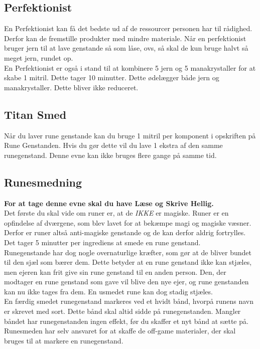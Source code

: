 \subsection{Perfektionist}
En Perfektionist kan få det bedste ud af de ressourcer personen har til rådighed. Derfor kan de fremstille produkter med mindre materiale. Når en perfektionist bruger jern til at lave genstande så som låse, ovs, så skal de kun bruge halvt så meget jern, rundet op.\\

En Perfektionist er også i stand til at kombinere 5 jern og 5 manakrystaller for at skabe 1 mitril. Dette tager 10 minutter. Dette ødelægger både jern og manakrystaller. Dette bliver ikke reduceret.\\

\subsection{Titan Smed}
Når du laver rune genstande kan du bruge 1 mitril per komponent i opskriften på Rune Genstanden. Hvis du gør dette vil du lave 1 ekstra af den samme runegenstand. Denne evne kan ikke bruges flere gange på samme tid.

\subsection{Runesmedning}
\textbf{For at tage denne evne skal du have Læse og Skrive Hellig.}\\
Det første du skal vide om runer er, at de \emph{IKKE} er magiske. Runer er en opfindelse af dværgene, som blev lavet for at bekæmpe magi og magiske væsner. Derfor er runer altså anti-magiske genstande og de kan derfor aldrig fortrylles.\\
Det tager 5 minutter per ingrediens at smede en rune genstand.\\
Runegenstande har dog nogle overnaturlige kræfter, som gør at de bliver bundet til den sjæl som bærer dem. Dette betyder at en rune genstand ikke kan stjæles, men ejeren kan frit give sin rune genstand til en anden person. Den, der modtager en rune genstand som gave vil blive den nye ejer, og rune genstanden kan nu ikke tages fra dem. En usmedet rune kan dog stadig stjæles.\\

En færdig smedet runegenstand markeres ved et hvidt bånd, hvorpå runens navn er skrevet med sort. Dette bånd skal altid sidde på runegenstanden. Mangler båndet har runegenstanden ingen effekt, før du skaffer et nyt bånd at sætte på. Runesmeden har selv ansvaret for at skaffe de off-game materialer, der skal bruges til at markere en runegenstand.\\

